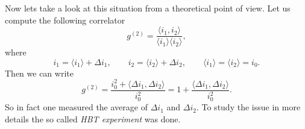 Now lets take a look at this situation from a theoretical point of view. Let us compute the following correlator
\begin{equation}
	g^{(2)} = \frac{\langle i_1, i_2 \rangle }{\langle i_1 \rangle \langle i_2 \rangle},
\end{equation}
where
\begin{equation}
	i_1 = \langle i_1 \rangle + \Delta i_1, \qquad i_2 = \langle i_2 \rangle + \Delta i_2, \qquad \langle i_1 \rangle = \langle i_2 \rangle = i_0.
\end{equation}
Then we can write
\begin{equation}
	g^{(2)} = \frac{i_0^2 + \langle \Delta i_1, \Delta i_2 \rangle}{i_0^2} = 1 + \frac{\langle \Delta i_1, \Delta i_2 \rangle}{i_0^2}.
\end{equation}
So in fact one measured the average of $\Delta i_1$ and $\Delta i_2$. To study the issue in more details the so called \textit{HBT experiment} was done. 
